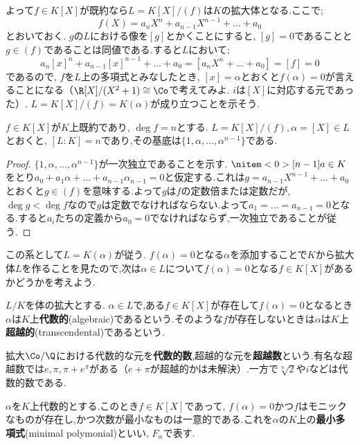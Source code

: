 よって$f\in K[X]$が既約なら$L=K[X]/(f)$は$K$の拡大体となる.ここで;
\[f(X)=a_nX^n+a_{n-1}X^{n-1}+\dots+a_0\]
とおいておく. $g$の$L$における像を$[g]$とかくことにすると, $[g]=0$であることと$g\in (f)$であることは同値である.すると$L$において;
\[a_n[x]^n+a_{n-1}[x]^{n-1}+\dots+a_0=[a_nX^n+\dots+a_0]=[f]=0\]
であるので, $f$を$L$上の多項式とみなしたとき, $[x]=\alpha$とおくと$f(\alpha)=0$が言えることになる（$\R[X]/(X^2+1)\cong\Co$で考えてみよ. $i$は$[X]$に対応する元であった）. $L=K[X]/(f)=K(\alpha)$が成り立つことを示そう.

\begin{prop}\label{prop:既約多項式の商による拡大}
	$f\in K[X]$が$K$上既約であり, $\deg f=n$とする. $L=K[X]/(f),\alpha=[X]\in L$とおくと, $[L:K]=n$であり,その基底は$\{1,\alpha,\dots,\alpha^{n-1}\}$である.
\end{prop}

\begin{proof}
	$\{1,\alpha,\dots,\alpha^{n-1}\}$が一次独立であることを示す. $\nitem<0>[n-1]{a}\in K$をとり$a_0+a_1\alpha+\dots+a_{n-1}\alpha_{n-1}=0$と仮定する.これは$g=a_{n-1}X^{n-1}+\dots+a_0$とおくと$g\in (f)$を意味する.よって$g$は$f$の定数倍または定数だが, $\deg g<\deg f$なので$g$は定数でなければならない.よって$a_1=\dots=a_{n-1}=0$となる.すると$a_i$たちの定義から$a_0=0$でなければならず,一次独立であることが従う.
\end{proof}

この系として$L= K(\alpha)$が従う. $f(\alpha)=0$となる$\alpha$を添加することで$K$から拡大体$L$を作ることを見たので,次は$\alpha\in L$について$f(\alpha)=0$となる$f\in K[X]$があるかどうかを考えよう.

\begin{defi}[代数的]
	$L/K$を体の拡大とする. $\alpha\in L$で,ある$f\in K[X]$が存在して$f(\alpha)=0$となるとき$\alpha$は$K$上\textbf{代数的}(algebraic)であるという.そのような$f$が存在しないときは$\alpha$は$K$上\textbf{超越的}(transcendental)であるという.
\end{defi}

拡大$\Co/\Q$における代数的な元を\textbf{代数的数},超越的な元を\textbf{超越数}という.有名な超越数では$e,\pi,\pi+e^\pi$がある（$e+\pi$が超越的かは未解決）.一方で$\sqrt[n]{2}$や$i$などは代数的数である.

\begin{defi}[最小多項式]
	$\alpha$を$K$上代数的とする.このとき$f\in K[X]$であって, $f(\alpha)=0$かつ$f$はモニックなものが存在し,かつ次数が最小なものは一意的である.これを$\alpha$の$K$上の\textbf{最小多項式}(minimal polymonial)といい, $F_\alpha$で表す.
\end{defi}

